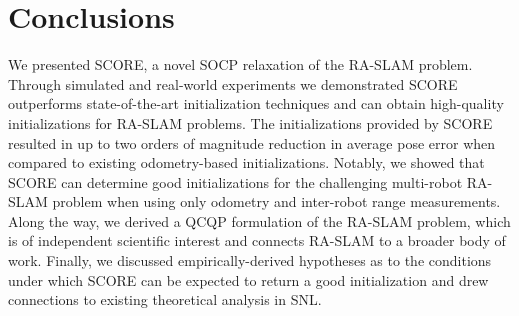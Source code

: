 \section{Conclusions}

We presented SCORE, a novel SOCP relaxation of the RA-SLAM problem. Through
simulated and real-world experiments we demonstrated SCORE outperforms
state-of-the-art initialization techniques and can obtain high-quality
initializations for RA-SLAM problems. The initializations provided by SCORE
resulted in up to two orders of magnitude reduction in average pose error when
compared to existing odometry-based initializations. Notably, we showed that
SCORE can determine good initializations for the challenging multi-robot RA-SLAM
problem when using only odometry and inter-robot range measurements. Along the
way, we derived a QCQP formulation of the RA-SLAM problem, which is of
independent scientific interest and connects RA-SLAM to a broader body of work.
Finally, we discussed empirically-derived hypotheses as to the conditions under
which SCORE can be expected to return a good initialization and drew connections
to existing theoretical analysis in SNL.
